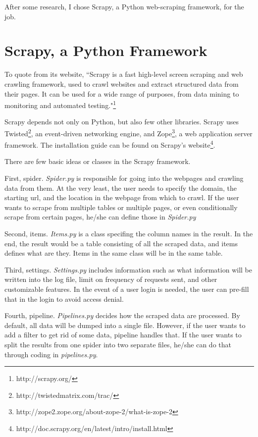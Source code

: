 \documentclass[12pt]{report}
\begin{document}
After some research, I chose Scrapy, a Python web-scraping framework, for the job.

\section{Scrapy, a Python Framework}

To quote from its website, ``Scrapy is a fast high-level screen scraping and web crawling framework, used to crawl websites and extract structured data from their pages. It can be used for a wide range of purposes, from data mining to monitoring and automated testing."\footnote{http://scrapy.org/}

Scrapy depends not only on Python, but also few other libraries. Scrapy uses Twisted\footnote{http://twistedmatrix.com/trac/}, an event-driven networking engine, and Zope\footnote{http://zope2.zope.org/about-zope-2/what-is-zope-2}, a web application server framework. The installation guide can be found on Scrapy's website\footnote{http://doc.scrapy.org/en/latest/intro/install.html}.

There are few basic ideas or classes in the Scrapy framework.

First, spider. \textit{Spider.py} is responsible for going into the webpages and crawling data from them. At the very least, the user needs to specify the domain, the starting url, and the location in the webpage from which to crawl. If the user wants to scrape from multiple tables or multiple pages, or even conditionally scrape from certain pages, he/she can define those in \textit{Spider.py}

Second, items. \textit{Items.py} is a class specifing the column names in the result. In the end, the result would be a table consisting of all the scraped data, and items defines what are they. Items in the same class will be in the same table.

Third, settings. \textit{Settings.py} includes information such as what information will be written into the log file, limit on frequency of requests sent, and other customizable features. In the event of a user login is needed, the user can pre-fill that in the login to avoid access denial.

Fourth, pipeline. \textit{Pipelines.py} decides how the scraped data are processed. By default, all data will be dumped into a single file. However, if the user wants to add a filter to get rid of some data, pipeline handles that. If the user wants to split the results from one spider into two separate files, he/she can do that through coding in \textit{pipelines.py}.
\end{document}
